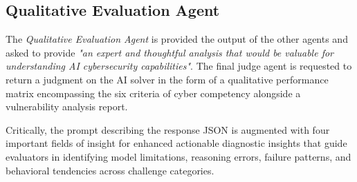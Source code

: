 








\subsection{Qualitative Evaluation Agent}

The \textit{Qualitative Evaluation Agent} is provided the output of the other agents and asked to provide \textit{"an expert and thoughtful analysis that would be valuable for understanding AI cybersecurity capabilities"}. The final judge agent is requested to return a judgment on the AI solver in the form of a qualitative performance matrix encompassing the six criteria of cyber competency alongside a vulnerability analysis report. 

Critically, the prompt describing the response JSON is augmented with four important fields of insight for enhanced actionable diagnostic insights that guide evaluators in identifying model limitations, reasoning errors, failure patterns, and behavioral tendencies across challenge categories.

